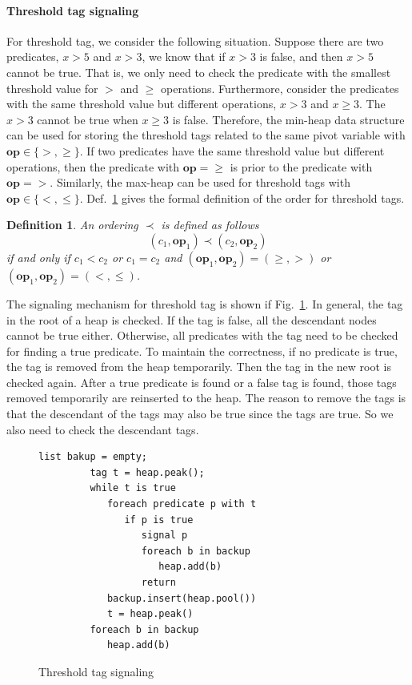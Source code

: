 \documentclass[preprint]{sigplanconf}
\newtheorem{definition}{Definition}
\begin{document}
\paragraph{Threshold tag signaling}
For threshold tag, we consider the following situation. Suppose there are two 
predicates, $x > 5$ and $x > 3$, we know that if $x > 3$ is false, and then 
$x > 5$ cannot be true. That is, we only need to check the predicate with the 
smallest threshold value for $>$ and $\ge$ operations. Furthermore, consider the predicates
with the same threshold value but different operations, $x > 3$ and $x \ge 3$.
The $x > 3$ cannot be true when $x \ge 3$ is false. Therefore, the min-heap 
data structure can be used for storing the threshold tags related to the same 
pivot variable with $\boldsymbol{op} \in \{>, \ge\}$. If two predicates have 
the same threshold value but different operations, then the predicate with 
$\boldsymbol{op}=\ge$ is prior to the predicate with $\boldsymbol{op}=>$.
Similarly, the max-heap can be used for threshold tags with $\boldsymbol{op}
\in \{<, \le\}$. Def.~\ref{def:th_order} gives the formal definition of the 
order for threshold tags. 

\begin{definition} \label{def:th_order}
    An ordering $\prec$ is defined as follows
\[
   (c_1, \boldsymbol{op}_1) \prec (c_2, \boldsymbol{op}_2)
\]
if and only if $c_1 < c_2$ or $c_1 = c_2$ and $(\boldsymbol{op}_1,
\boldsymbol{op}_2)  = (\ge, >)$ or $(\boldsymbol{op}_1, \boldsymbol{op}_2) =
(<, \le)$. 
\end{definition}

The signaling mechanism for threshold tag is shown if Fig.~\ref{fig:th_sig}. In
general, the tag in the root of a heap is checked. If the tag is false, all the
descendant nodes cannot be true either. Otherwise, all predicates with the tag
need to be checked for finding a true predicate. To maintain the correctness, 
if no predicate is true, the tag is removed from the heap temporarily. Then the
tag in the new root is checked again. After a true predicate is found or a
false tag is found, those tags removed temporarily are reinserted to the heap.
The reason to remove the tags is that the descendant of the tags may also be
true since the tags are true. So we also need to check the descendant tags.
\begin{figure}[ht!]
    \begin{Verbatim}[fontsize=\footnotesize,gobble=8,frame=lines,
            framesep=3mm]
         list bakup = empty;
         tag t = heap.peak();
         while t is true
            foreach predicate p with t
               if p is true
                  signal p
                  foreach b in backup 
                     heap.add(b)
                  return
            backup.insert(heap.pool())
            t = heap.peak()
         foreach b in backup 
            heap.add(b)
    \end{Verbatim}
  \caption{Threshold tag signaling}
  \label{fig:th_sig}
\end{figure}
\end{document}
